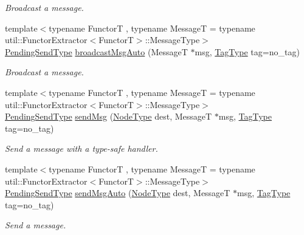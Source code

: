 \begin{DoxyCompactItemize}
\begin{DoxyCompactList}\small\item\em Broadcast a message. \end{DoxyCompactList}\item 
{\footnotesize template$<$typename FunctorT , typename MessageT  = typename util\+::\+Functor\+Extractor$<$\+Functor\+T$>$\+::\+Message\+Type$>$ }\\\hyperlink{structvt_1_1messaging_1_1_active_messenger_a3626a6ca76d8ad4ec7c3b47a2c70d3a8}{Pending\+Send\+Type} \hyperlink{group__functorsend_ga57f702de3ea781d655728a6cbeae9895}{broadcast\+Msg\+Auto} (MessageT $\ast$msg, \hyperlink{namespacevt_a84ab281dae04a52a4b243d6bf62d0e52}{Tag\+Type} tag=no\+\_\+tag)
\begin{DoxyCompactList}\small\item\em Broadcast a message. \end{DoxyCompactList}\item 
{\footnotesize template$<$typename FunctorT , typename MessageT  = typename util\+::\+Functor\+Extractor$<$\+Functor\+T$>$\+::\+Message\+Type$>$ }\\\hyperlink{structvt_1_1messaging_1_1_active_messenger_a3626a6ca76d8ad4ec7c3b47a2c70d3a8}{Pending\+Send\+Type} \hyperlink{group__functorsend_ga9a7d3d70ca04c51781771661fa5d3795}{send\+Msg} (\hyperlink{namespacevt_a866da9d0efc19c0a1ce79e9e492f47e2}{Node\+Type} dest, MessageT $\ast$msg, \hyperlink{namespacevt_a84ab281dae04a52a4b243d6bf62d0e52}{Tag\+Type} tag=no\+\_\+tag)
\begin{DoxyCompactList}\small\item\em Send a message with a type-\/safe handler. \end{DoxyCompactList}\item 
{\footnotesize template$<$typename FunctorT , typename MessageT  = typename util\+::\+Functor\+Extractor$<$\+Functor\+T$>$\+::\+Message\+Type$>$ }\\\hyperlink{structvt_1_1messaging_1_1_active_messenger_a3626a6ca76d8ad4ec7c3b47a2c70d3a8}{Pending\+Send\+Type} \hyperlink{group__functorsend_ga751cb62d16dff408b281306733f2419d}{send\+Msg\+Auto} (\hyperlink{namespacevt_a866da9d0efc19c0a1ce79e9e492f47e2}{Node\+Type} dest, MessageT $\ast$msg, \hyperlink{namespacevt_a84ab281dae04a52a4b243d6bf62d0e52}{Tag\+Type} tag=no\+\_\+tag)
\begin{DoxyCompactList}\small\item\em Send a message. \end{DoxyCompactList}\item 

\end{DoxyCompactItemize}
